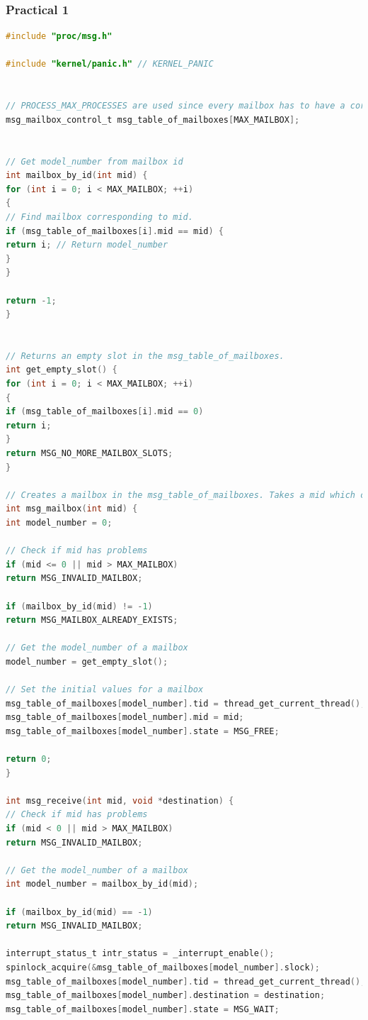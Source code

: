 \documentclass[11pt,a4paper]{article}
\theoremstyle{plain}
\theoremstyle{definition}
\theoremstyle{remark}
\numberwithin{equation}{section}
\begin{document}
\subsubsection*{Practical 1}
\begin{lstlisting}[language=C,caption={msg.c},label={lst:msg_c}]
#include "proc/msg.h"

#include "kernel/panic.h" // KERNEL_PANIC


// PROCESS_MAX_PROCESSES are used since every mailbox has to have a corresponding process.
msg_mailbox_control_t msg_table_of_mailboxes[MAX_MAILBOX];


// Get model_number from mailbox id
int mailbox_by_id(int mid) {
for (int i = 0; i < MAX_MAILBOX; ++i)
{
// Find mailbox corresponding to mid.
if (msg_table_of_mailboxes[i].mid == mid) {
return i; // Return model_number
}
}

return -1;
}


// Returns an empty slot in the msg_table_of_mailboxes.
int get_empty_slot() {
for (int i = 0; i < MAX_MAILBOX; ++i)
{
if (msg_table_of_mailboxes[i].mid == 0)
return i;
}
return MSG_NO_MORE_MAILBOX_SLOTS;
}

// Creates a mailbox in the msg_table_of_mailboxes. Takes a mid which corresponds to the current process.
int msg_mailbox(int mid) {
int model_number = 0;

// Check if mid has problems
if (mid <= 0 || mid > MAX_MAILBOX)
return MSG_INVALID_MAILBOX;

if (mailbox_by_id(mid) != -1)
return MSG_MAILBOX_ALREADY_EXISTS;

// Get the model_number of a mailbox
model_number = get_empty_slot();

// Set the initial values for a mailbox
msg_table_of_mailboxes[model_number].tid = thread_get_current_thread();
msg_table_of_mailboxes[model_number].mid = mid;
msg_table_of_mailboxes[model_number].state = MSG_FREE;

return 0;
}

int msg_receive(int mid, void *destination) {
// Check if mid has problems
if (mid < 0 || mid > MAX_MAILBOX)
return MSG_INVALID_MAILBOX;

// Get the model_number of a mailbox
int model_number = mailbox_by_id(mid);

if (mailbox_by_id(mid) == -1)
return MSG_INVALID_MAILBOX;

interrupt_status_t intr_status = _interrupt_enable();
spinlock_acquire(&msg_table_of_mailboxes[model_number].slock);
msg_table_of_mailboxes[model_number].tid = thread_get_current_thread();
msg_table_of_mailboxes[model_number].destination = destination;
msg_table_of_mailboxes[model_number].state = MSG_WAIT;


\end{lstlisting}
\end{document}

